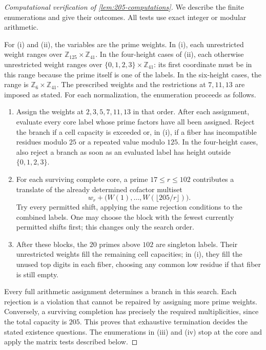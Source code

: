 \documentclass[11pt,reqno]{amsart}
\newcommand{\Z}{\mathbb Z}
\theoremstyle{definition}
\theoremstyle{remark}
\numberwithin{equation}{section}
\begin{document}
\begin{proof}[Computational verification of \cref{lem:205-computations}]
We describe the finite enumerations and give their outcomes. All tests
use exact integer or modular arithmetic.

For (i) and (ii), the variables are the prime weights. In (i), each
unrestricted weight ranges over $\Z_{125}\times\Z_{41}$.
In the four-height cases of (ii), each otherwise unrestricted weight
ranges over $\{0,1,2,3\}\times\Z_{41}$: its first coordinate must
be in this range because the prime itself is one of the labels.
In the six-height cases, the range is $\Z_6\times\Z_{41}$.
The prescribed weights and the restrictions at $7,11,13$ are imposed
as stated. For each normalization, the enumeration proceeds as follows.
\begin{enumerate}
\item Assign the weights at $2,3,5,7,11,13$ in that order. After
each assignment, evaluate every core label whose prime factors have
all been assigned. Reject the branch if a cell capacity is exceeded
or, in (i), if a fiber has incompatible residues modulo $25$ or a
repeated value modulo $125$.
In the four-height cases, also reject a branch as soon as an evaluated
label has height outside $\{0,1,2,3\}$.
\item For each surviving complete core, a prime $17\le r\le102$
contributes a translate of the already determined cofactor multiset
\[
 w_r+\bigl(W(1),\ldots,W(\lfloor205/r\rfloor)\bigr).
\]
Try every permitted shift, applying the same rejection conditions
to the combined labels. One may choose the block with the fewest
currently permitted shifts first; this changes only the search order.
\item After these blocks, the $20$ primes above $102$ are singleton
labels. Their unrestricted weights fill the remaining cell capacities;
in (i), they fill the unused top digits in each fiber, choosing any
common low residue if that fiber is still empty.
\end{enumerate}
Every full arithmetic assignment determines a branch in this search.
Each rejection is a violation that cannot be repaired by assigning
more prime weights. Conversely, a surviving completion has precisely
the required multiplicities, since the total capacity is $205$.
This proves that exhaustive termination decides the stated existence
questions. The enumerations in (iii) and (iv) stop at the core and
apply the matrix tests described below.


\end{proof}
\end{document}
